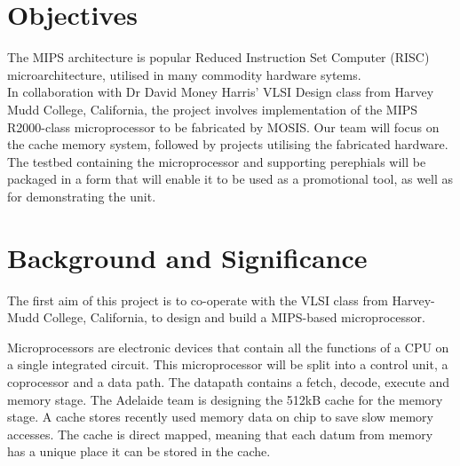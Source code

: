 \documentclass[a4paper,12pt]{article}
\begin{document}
\newpage
\section*{Objectives}
The MIPS architecture is popular Reduced Instruction Set Computer (RISC) microarchitecture, utilised in many commodity hardware sytems.
\\In collaboration with Dr David Money Harris' VLSI Design class from Harvey Mudd College, California, the project involves implementation of the MIPS R2000-class microprocessor to be fabricated by MOSIS. Our team will focus on the cache memory system, followed by projects utilising the fabricated hardware.
\\The testbed containing the microprocessor and supporting perephials will be packaged in a form that will enable it to be used as a promotional tool, as well as for demonstrating the unit.

\newpage
\tableofcontents

\newpage
\section{Background and Significance}

The first aim of this project is to co-operate with the VLSI class
from Harvey-Mudd College, California, to design and build a MIPS-based
microprocessor.

Microprocessors are electronic devices that contain all the functions
of a CPU on a single integrated circuit. This microprocessor will be
split into a control unit, a coprocessor and a data path. The datapath
contains a fetch, decode, execute and memory stage. The Adelaide team
is designing the 512kB cache for the memory stage. A cache stores
recently used memory data on chip to save slow memory accesses. The
cache is direct mapped, meaning that each datum from memory has a
unique place it can be stored in the cache.
\end{document}
